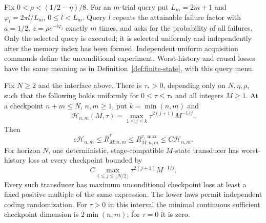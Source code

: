 Fix $0<\rho<(1/2-\eta)/8$. For an $m$-trial query put
$L_m=2m+1$ and $\varphi_l=2\pi l/L_m$, $0\le l<L_m$.
Query $l$ repeats the attainable failure factor with
$a=1/2$, $z=\rho e^{-i\varphi_l}$ exactly $m$ times, and asks for
the probability of all failures. Only the selected query is executed;
it is selected uniformly and independently after the memory index has
been formed. Independent uniform acquisition commands define the
unconditional experiment. Worst-history and causal losses have the same
meaning as in Definition~\ref{def:finite-state}, with this query menu.

\begin{theorem}
\label{thm:circle-resolution}
Fix $N\ge2$ and the interface above. There is $\tau_*>0$, depending
only on $N,\eta,\rho$, such that the following holds uniformly for
$0\le\tau\le\tau_*$ and all integers $M\ge1$. At a checkpoint
$n+m\le N$, $n,m\ge1$, put $k=\min(n,m)$ and
\begin{equation}\label{eq:circle-profile}
 \mathcal H_{n,m}(M,\tau)
 =\max_{1\le j\le k}\tau^{2(j+1)}M^{-1/j}.
\end{equation}
Then
\begin{equation}\label{eq:circle-checkpoint-law}
 c\mathcal H_{n,m}\le\overline R^{\tau}_{M;n,m}
 \le R^{\tau,\max}_{M;n,m}\le C\mathcal H_{n,m}.
\end{equation}
For horizon $N$, one deterministic, stage-compatible $M$-state transducer
has worst-history loss at every checkpoint bounded by
\begin{equation}\label{eq:circle-causal-profile}
 C\max_{1\le j\le\lfloor N/2\rfloor}
          \tau^{2(j+1)}M^{-1/j}.
\end{equation}
Every such transducer has maximum unconditional checkpoint loss at least
a fixed positive multiple of the same expression. The lower laws permit
independent coding randomization. For $\tau>0$ in this interval the
minimal continuous sufficient checkpoint dimension is $2\min(n,m)$;
for $\tau=0$ it is zero.
\end{theorem}



